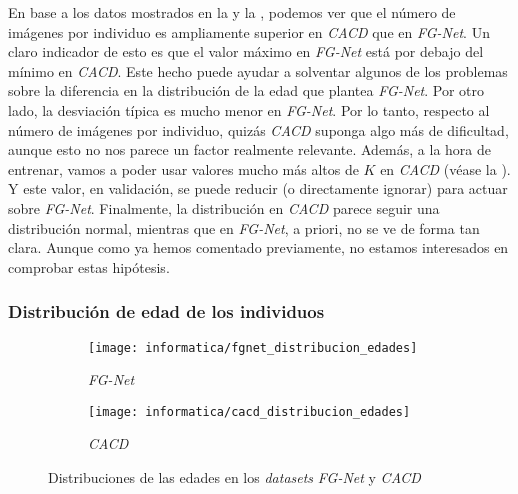 En base a los datos mostrados en la  y la , podemos ver que el número de imágenes por individuo es ampliamente superior en \textit{CACD} que en \textit{FG-Net}. Un claro indicador de esto es que el valor máximo en \textit{FG-Net} está por debajo del mínimo en \textit{CACD}. Este hecho puede ayudar a solventar algunos de los problemas sobre la diferencia en la distribución de la edad que plantea \textit{FG-Net}. Por otro lado, la desviación típica es mucho menor en \textit{FG-Net}. Por lo tanto, respecto al número de imágenes por individuo, quizás \textit{CACD} suponga algo más de dificultad, aunque esto no nos parece un factor realmente relevante. Además, a la hora de entrenar, vamos a poder usar valores mucho más altos de $K$ en \textit{CACD} (véase la ). Y este valor, en validación, se puede reducir (o directamente ignorar) para actuar sobre \textit{FG-Net}. Finalmente, la distribución en \textit{CACD} parece seguir una distribución normal, mientras que en \textit{FG-Net}, a priori, no se ve de forma tan clara. Aunque como ya hemos comentado previamente, no estamos interesados en comprobar estas hipótesis.

\subsubsection{Distribución de edad de los individuos} \label{isubsubs:conjunta_fgnet_cacd_edades}

\begin{figure}[!hbtp]
\centering
    \begin{subfigure}{.5\textwidth}
        \centering
        \texttt{[image: informatica/fgnet\_distribucion\_edades]}
        \caption{\textit{FG-Net}}
    \end{subfigure}%
    \begin{subfigure}{.5\textwidth}
        \centering
        \texttt{[image: informatica/cacd\_distribucion\_edades]}
        \caption{\textit{CACD}}
    \end{subfigure}
    \caption{Distribuciones de las edades en los \textit{datasets} \textit{FG-Net} y \textit{CACD}}
    \label{img:conjunta_fgnet_cacd_edades}
\end{figure}

